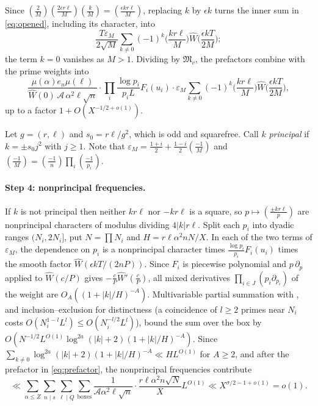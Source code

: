 \documentclass[11pt,colorlinks]{charlie}
\newcommand{\cA}{\mathcal{A}}
\begin{document}
Since $(\tfrac2M)(\tfrac{2\epsilon r\ell}M)(\tfrac kM)=(\tfrac{\epsilon kr\ell}M)$, replacing $k$ by $\epsilon k$ turns the inner sum in \eqref{eq:opened}, including its character, into
\[
 \frac{T\varepsilon_M}{2\sqrt M}\sum_{k\ne0}(-1)^k\Big(\frac{kr\ell}M\Big)\widehat W\Big(\frac{\epsilon kT}{2M}\Big);
\]
the term $k=0$ vanishes as $M>1$. Dividing by $\mathfrak M_v$, the prefactors combine with the prime weights into
\begin{equation}\label{eq:prefactor}
 \frac{\mu(\alpha)e_n\mu(\ell)}{\widehat W(0)\,\cA\,\alpha^2\ell\sqrt n}\cdot\prod_i\frac{\log p_i}{p_iL}F_i(u_i)\cdot\varepsilon_M\sum_{k\ne0}(-1)^k\Big(\frac{kr\ell}M\Big)\widehat W\Big(\frac{\epsilon kT}{2M}\Big),
\end{equation}
up to a factor $1+O(X^{-1/2+o(1)})$.

Let $g=(r,\ell)$ and $s_0=r\ell/g^2$, which is odd and squarefree. Call $k$ \emph{principal} if $k=\pm s_0j^2$ with $j\ge1$. Note that $\varepsilon_M=\tfrac{1+i}2+\tfrac{1-i}2(\tfrac{-1}M)$ and $(\tfrac{-1}M)=(\tfrac{-1}n)\prod_i(\tfrac{-1}{p_i})$.

\paragraph{Step 4: nonprincipal frequencies.}
If $k$ is not principal then neither $kr\ell$ nor $-kr\ell$ is a square, so $p\mapsto(\tfrac{\pm kr\ell}p)$ are nonprincipal characters of modulus dividing $4|k|r\ell$. Split each $p_i$ into dyadic ranges $(N_i,2N_i]$, put $N=\prod N_i$ and $H=r\ell\alpha^2nN/X$. In each of the two terms of $\varepsilon_M$, the dependence on $p_i$ is a nonprincipal character times $\frac{\log p_i}{p_i}F_i(u_i)$ times the smooth factor $\widehat W(\epsilon kT/(2nP))$. Since $F_i$ is piecewise polynomial and $p\,\partial_p$ applied to $\widehat W(c/P)$ gives $-\tfrac cP\widehat W'(\tfrac cP)$, all mixed derivatives $\prod_{i\in J}(p_i\partial_{p_i})$ of the weight are $O_A((1+|k|/H)^{-A})$. Multivariable partial summation with , and inclusion--exclusion for distinctness (a coincidence of $l\ge2$ primes near $N_i$ costs $O(N_i^{1-l}L^l)\le O(N_i^{-l/2}L^l)$), bound the sum over the box by $O(N^{-1/2}L^{O(1)}\log^{2a}(|k|+2)(1+|k|/H)^{-A})$. Since $\sum_{k\ne0}\log^{2a}(|k|+2)(1+|k|/H)^{-A}\ll HL^{O(1)}$ for $A\ge2$, and after the prefactor in \eqref{eq:prefactor}, the nonprincipal frequencies contribute
\[
 \ll\sum_{\alpha\le Z}\sum_{n\mid s}\sum_{\ell\mid Q}\sum_{\text{boxes}}\frac1{\cA\alpha^2\ell\sqrt n}\cdot\frac{r\ell\alpha^2n\sqrt N}XL^{O(1)}\ll X^{\sigma/2-1+o(1)}=o(1).
\]
\end{document}
